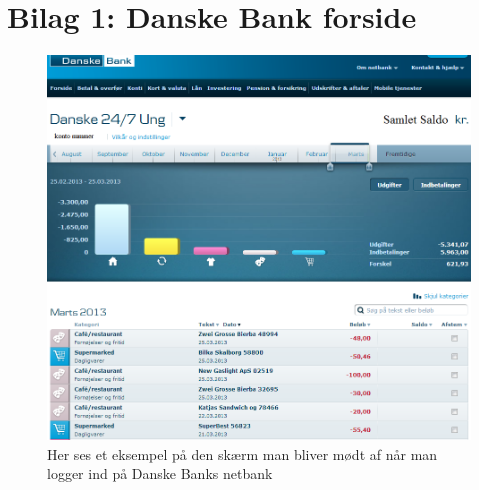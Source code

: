 \chapter*{Bilag 1: Danske Bank forside}
\thispagestyle{empty}
\setcounter{page}{1}
\begin{figure}[H]
\includegraphics [width=\linewidth]{Billeder/bilagdb1.png}
\caption {Her ses et eksempel på den skærm man bliver mødt af når man logger ind på Danske Banks netbank}
\label {bilagdb1}
\end{figure}

